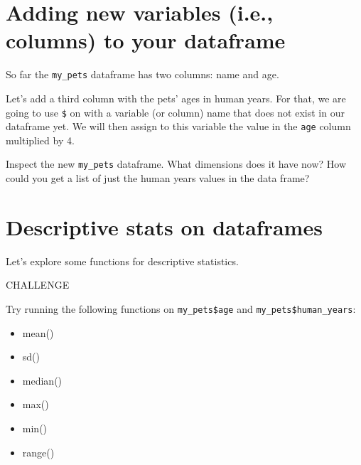 \documentclass[]{book}
\newenvironment{Shaded}{\begin{snugshade}}{\end{snugshade}}
\newcommand{\DecValTok}[1]{\textcolor[rgb]{0.00,0.00,0.81}{#1}}
\newcommand{\NormalTok}[1]{#1}
\newcommand{\OperatorTok}[1]{\textcolor[rgb]{0.81,0.36,0.00}{\textbf{#1}}}
\newcommand{\StringTok}[1]{\textcolor[rgb]{0.31,0.60,0.02}{#1}}
\begin{document}
\hypertarget{adding-new-variables-i.e.-columns-to-your-dataframe}{%
\section{Adding new variables (i.e., columns) to your dataframe}\label{adding-new-variables-i.e.-columns-to-your-dataframe}}

So far the \texttt{my\_pets} dataframe has two columns: name and age.

Let's add a third column with the pets' ages in human years. For that, we are going to use \texttt{\$} on with a variable (or column) name that does not exist in our dataframe yet. We will then assign to this variable the value in the \texttt{age} column multiplied by 4.

\begin{Shaded}
\end{Shaded}

\leavevmode\hypertarget{question}{}%
Inspect the new \texttt{my\_pets} dataframe. What dimensions does it have now? How could you get a list of just the human years values in the data frame?

\hypertarget{descriptive-stats-on-dataframes}{%
\section{Descriptive stats on dataframes}\label{descriptive-stats-on-dataframes}}

Let's explore some functions for descriptive statistics.

\leavevmode\hypertarget{challenge}{}%
CHALLENGE

Try running the following functions on \texttt{my\_pets\$age} and \texttt{my\_pets\$human\_years}:

\begin{itemize}
\item
  mean()
\item
  sd()
\item
  median()
\item
  max()
\item
  min()
\item
  range()
\end{itemize}
\end{document}
